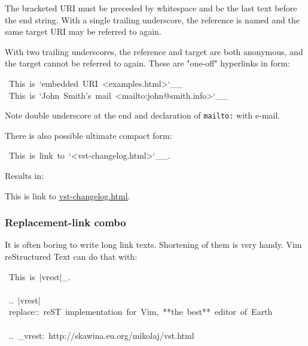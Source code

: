 \documentclass[12pt]{article}
\begin{document}
The bracketed URI must be preceded by whitespace and be the last text
before the end string. With a single trailing underscore, the
reference is named and the same target URI may be referred to again.

With two trailing underscores, the reference and target are both
anonymous, and the target cannot be referred to again. These are
"one-off" hyperlinks in form:

\begin{ttfamily}\begin{flushleft}
\mbox{~This~is~`embedded~URI~<examples.html>`\_\_}\\
\mbox{~This~is~`John~Smith's~mail~<mailto:john@smith.info>`\_\_}\\
\end{flushleft}\end{ttfamily}

Note double underscore at the end and declaration of \texttt{mailto:} with e-mail.

There is also possible ultimate compact form:

\begin{ttfamily}\begin{flushleft}
\mbox{~This~is~link~to~`<vst-changelog.html>`\_\_.}\\
\end{flushleft}\end{ttfamily}

Results in:

This is link to \href{vst-changelog.html}{vst-changelog.html}.

\hypertarget{lreplacement-link-combo}{}
\subsubsection{Replacement-link combo}

It is often boring to write long link texts. Shortening of them is very handy.
Vim reStructured Text can do that with:

\begin{ttfamily}\begin{flushleft}
\mbox{~This~is~|vrest|\_.}\\
\mbox{}\\
\mbox{~..~|vrest|~replace::~reST~implementation~for~Vim,~**the~best**~editor~of~Earth}\\
\mbox{}\\
\mbox{~..~\_vrest:~http://skawina.eu.org/mikolaj/vst.html}\\
\end{flushleft}\end{ttfamily}
\end{document}
